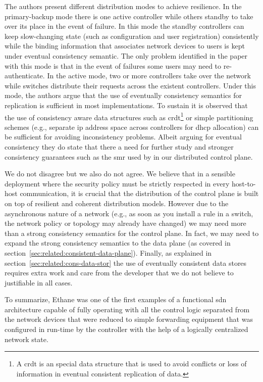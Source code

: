 The authors present different distribution modes to achieve resilience. 
In the primary-backup mode  there is one active controller while others standby to take over its place in the event of failure. 
In this mode the standby controllers can keep slow-changing state (such as configuration and user registration) consistently while the binding information that associates network devices to users is kept under eventual consistency semantic. 
The only problem identified in the paper with this mode is that in the event of failures some users may need to re-authenticate. 
In the active mode, two or more controllers take over the network while switches distribute their requests across the existent controllers.  
Under this mode, the authors argue that  the use of eventually consistency semantics for replication is sufficient in most implementations. To  sustain it is observed that the use of consistency aware data structures such as \gls{crdt}\footnote{A \gls{crdt} is an special data structure that is used to avoid conflicts or loss of information in eventual consistent replication of data.} or simple partitioning schemes (e.g., separate \gls{ip} address space across controllers for \gls{dhcp} allocation) can be sufficient for avoiding inconsistency problems. 
Albeit arguing for eventual consistency they do state that there a need for further study and stronger consistency guarantees such as the \gls{smr} used by in our distributed control plane. 

We do not disagree but we also do not agree. 
We believe that in a sensible deployment where the security policy must be strictly respected in every host-to-host communication, it is crucial that the distribution of the control plane is built on top of resilient and coherent distribution models. 
However due to the asynchronous nature of a network (e.g., as soon as you install a rule in a switch, the network policy or topology may already have changed) we may need more than a strong consistency semantics for the control plane. In fact, we may need to expand the strong consistency semantics to the data plane (as covered in section~\ref{sec:related:consistent-data-plane}). 
Finally, as explained in section~\ref{sec:related:cons-data-stor} the use of eventually consistent data stores requires extra work and care from the developer that we do not believe to justifiable in all cases. 

To summarize, Ethane was one of the first examples  of a functional \gls{sdn} architecture capable of fully operating with all the control logic separated from the network devices that were reduced to simple forwarding equipment that was configured in run-time by the controller with the help of a logically centralized network state.  

